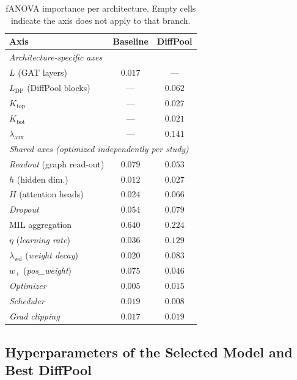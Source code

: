 \documentclass[10pt,a4paper,twocolumn,twoside]{article}
\begin{document}
\begin{table}[H]
\centering
\caption{fANOVA importance per architecture. Empty cells indicate the axis does not apply to that branch.}
\label{tab:main-effects}
\small
\begin{tabular}{lcc}
\toprule
\textbf{Axis} & \textbf{Baseline} & \textbf{DiffPool} \\
\midrule
\multicolumn{3}{l}{\textit{Architecture-specific axes}} \\[2pt]
$L$ (GAT layers)                          & $0.017$ & --- \\
$L_{\text{DP}}$ (DiffPool blocks)         & --- & $0.062$ \\
$K_{\text{top}}$                          & --- & $0.027$ \\
$K_{\text{bot}}$                          & --- & $0.021$ \\
$\lambda_{\text{aux}}$                    & --- & $\mathbf{0.141}$ \\
\midrule
\multicolumn{3}{l}{\textit{Shared axes (optimized independently per study)}} \\[2pt]
\textit{Readout} (graph read-out)         & $0.079$ & $0.053$ \\
$h$ (hidden dim.)                         & $0.012$ & $0.027$ \\
$H$ (attention heads)                     & $0.024$ & $0.066$ \\
\textit{Dropout}                          & $0.054$ & $0.079$ \\
MIL aggregation                           & $\mathbf{0.640}$ & $\mathbf{0.224}$ \\
$\eta$ (\textit{learning rate})           & $0.036$ & $\mathbf{0.129}$ \\
$\lambda_{\text{wd}}$ (\textit{weight decay}) & $0.020$ & $0.083$ \\
$w_+$ (\textit{pos\_weight})              & $0.075$ & $0.046$ \\
\textit{Optimizer}                        & $0.005$ & $0.015$ \\
\textit{Scheduler}                        & $0.019$ & $0.008$ \\
\textit{Grad clipping}                    & $0.017$ & $0.019$ \\
\bottomrule
\end{tabular}
\end{table}

\subsection{Hyperparameters of the Selected Model and Best DiffPool}
\label{app:best-params}
\end{document}
